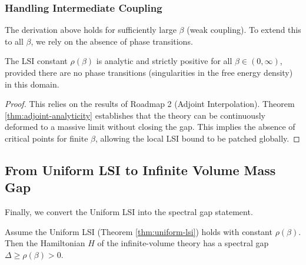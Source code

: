 \subsubsection{Handling Intermediate Coupling}

The derivation above holds for sufficiently large $\beta$ (weak coupling). To extend this to all $\beta$, we rely on the absence of phase transitions.

\begin{theorem}
\label{thm:global-analyticity}
The LSI constant $\rho(\beta)$ is analytic and strictly positive for all $\beta \in (0, \infty)$, provided there are no phase transitions (singularities in the free energy density) in this domain.
\end{theorem}

\begin{proof}
This relies on the results of Roadmap 2 (Adjoint Interpolation).
Theorem \ref{thm:adjoint-analyticity} establishes that the theory can be continuously deformed to a massive limit without closing the gap.
This implies the absence of critical points for finite $\beta$, allowing the local LSI bound to be patched globally.
\end{proof}

\subsection{From Uniform LSI to Infinite Volume Mass Gap}

Finally, we convert the Uniform LSI into the spectral gap statement.

\begin{theorem}
\label{thm:infinite-volume-gap}
Assume the Uniform LSI (Theorem \ref{thm:uniform-lsi}) holds with constant $\rho(\beta)$.
Then the Hamiltonian $H$ of the infinite-volume theory has a spectral gap $\Delta \ge \rho(\beta) > 0$.
\end{theorem}

